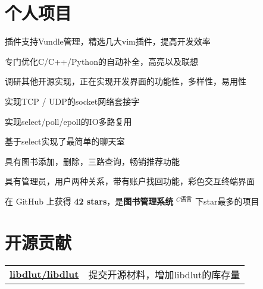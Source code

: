 \documentclass[]{deedy-resume-openfont}
\begin{document}
\begin{minipage}[t]{0.73\textwidth}

\section{个人项目}
\sectionsep
{}
\begin{tightemize}
    \item 插件支持Vundle管理，精选几大vim插件，提高开发效率
    \item 专门优化C/C++/Python的自动补全，高亮以及联想
    \item 调研其他开源实现，正在实现开发界面的功能性，多样性，易用性
    \end{tightemize}
\sectionsep

\begin{tightemize}
    \item 实现TCP / UDP的socket网络套接字
    \item 实现select/poll/epoll的IO多路复用
    \item 基于select实现了最简单的聊天室
    \end{tightemize}
\sectionsep

\begin{tightemize}
    \item 具有图书添加，删除，三路查询，畅销推荐功能
    \item 具有管理员，用户两种关系，带有账户找回功能，彩色交互终端界面
    \item 在 GitHub 上获得 \textbf{42 stars}，是\textbf{图书管理系统} $^{C语言}$ 下star最多的项目
    \end{tightemize}
\sectionsep





\section{开源贡献}
\begin{tabular}{ll}
\href{https://github.com/libdlut/libdlut/graphs/contributors}{\bf libdlut/libdlut} & 提交开源材料，增加libdlut的库存量 \\
\end{tabular}
\sectionsep


\end{minipage}
\end{document}
